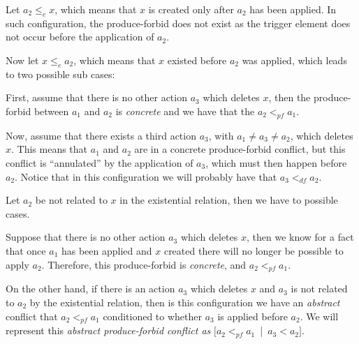 \begin{description}[style=nextline]
  \item[Related element:]
  Let $a_2 \leq_e x$, which means that $x$ is created only after $a_2$ has been applied. In such configuration, the produce-forbid does not exist as the trigger element does not occur before the application of $a_2$. 

    Now let $x \leq_e a_2$, which means that $x$ existed before $a_2$ was applied, which leads to two possible sub cases:

  First, assume that there is no other action $a_3$ which deletes $x$, then the produce-forbid between $a_1$ and $a_2$ is \emph{concrete} and we have that the $a_2 <_{pf} a_1$.

    Now, assume that there exists a third action $a_3$, with $a_1 \ne a_3 \ne a_2$, which deletes $x$. This means that $a_1$ and $a_2$ are in a concrete produce-forbid conflict, but this conflict is ``annulated'' by the application of $a_3$, which must then happen before $a_2$. Notice that in this configuration we will probably have that $a_3 <_{df} a_2$.

  \item[Unrelated element:]
    Let $a_2$ be not related to $x$ in the existential relation, then we have to possible cases.

    Suppose that there is no other action $a_3$ which deletes $x$, then we know for a fact that once $a_1$ has been applied and $x$ created there will no longer be possible to apply $a_2$. Therefore, this produce-forbid is \emph{concrete}, and $a_2 <_{pf} a_1$.

    On the other hand, if there is an action $a_3$ which deletes $x$ and $a_3$ is not related to $a_2$ by the existential relation, then is this configuration we have an \emph{abstract} conflict that $a_2 <_{pf} a_1$ conditioned to whether $a_3$ is applied before $a_2$. We will represent this \emph{abstract produce-forbid conflict as} \mbox{$[a_2 <_{pf} a_1$ | $a_3 < a_2]$}.
\end{description}

